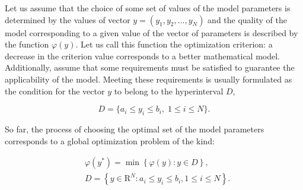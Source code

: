 \documentclass[mathematics,article,accept,pdftex,moreauthors]{Definitions/mdpi}
\begin{document}
Let us assume that the choice of some set of values of the model parameters is determined by the values of vector $y=(y_1,y_2,...,y_N)$ and the quality of the model corresponding to a given value of the vector of parameters is described by the function $\varphi(y)$. Let us call this function the optimization criterion: a decrease in the criterion value corresponds to a better mathematical model. Additionally, assume that some requirements must be satisfied to guarantee the applicability of the model. Meeting these requirements is usually formulated as the condition for the vector $y$ to belong to the hyperinterval $D$,
\begin{linenomath}
\begin{equation}
D=\{a_i \leq y_i \leq b_i, \; 1 \leq i \leq N\}.
\end{equation}
\end{linenomath}



So far, the process of choosing the optimal set of the model parameters corresponds to a global optimization problem of the kind:
\begin{linenomath}
\begin{equation}\label{main_problem}
\begin{aligned}
    & \varphi(y^\ast)=\min{\left\{\varphi(y):y\in D\right\}},\\
    & D=\left\{y\in \text{R}^N: a_i\leq y_i \leq b_i, 1\leq i \leq N\right\}.
\end{aligned}
\end{equation}
\end{linenomath}
\end{document}
